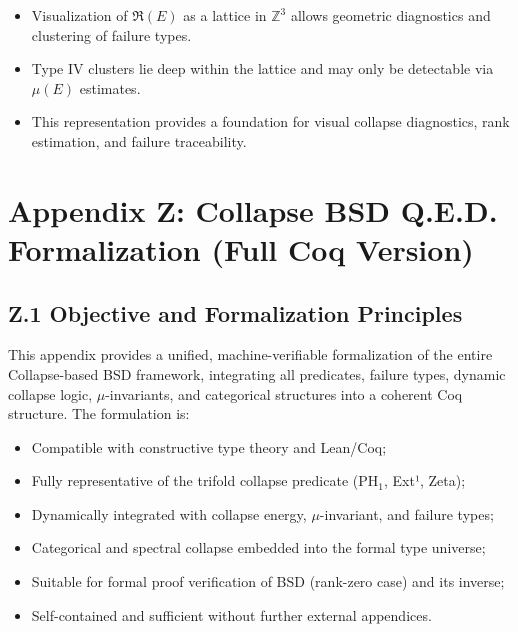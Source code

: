 \documentclass[11pt]{article}
\begin{document}
\begin{itemize}
  \item Visualization of $\mathfrak{R}(E)$ as a lattice in $\mathbb{Z}^3$ allows geometric diagnostics and clustering of failure types.
  \item Type IV clusters lie deep within the lattice and may only be detectable via $\mu(E)$ estimates.
  \item This representation provides a foundation for visual collapse diagnostics, rank estimation, and failure traceability.
\end{itemize}



\appendix
\section*{Appendix Z: Collapse BSD Q.E.D. Formalization (Full Coq Version)}

\subsection*{Z.1 Objective and Formalization Principles}

This appendix provides a unified, machine-verifiable formalization of the entire Collapse-based BSD framework, integrating all predicates, failure types, dynamic collapse logic, \(\mu\)-invariants, and categorical structures into a coherent Coq structure. The formulation is:

\begin{itemize}
  \item Compatible with constructive type theory and Lean/Coq;
  \item Fully representative of the trifold collapse predicate (\( \mathrm{PH}_1 \), Ext¹, Zeta);
  \item Dynamically integrated with collapse energy, \(\mu\)-invariant, and failure types;
  \item Categorical and spectral collapse embedded into the formal type universe;
  \item Suitable for formal proof verification of BSD (rank-zero case) and its inverse;
  \item Self-contained and sufficient without further external appendices.
\end{itemize}
\end{document}
